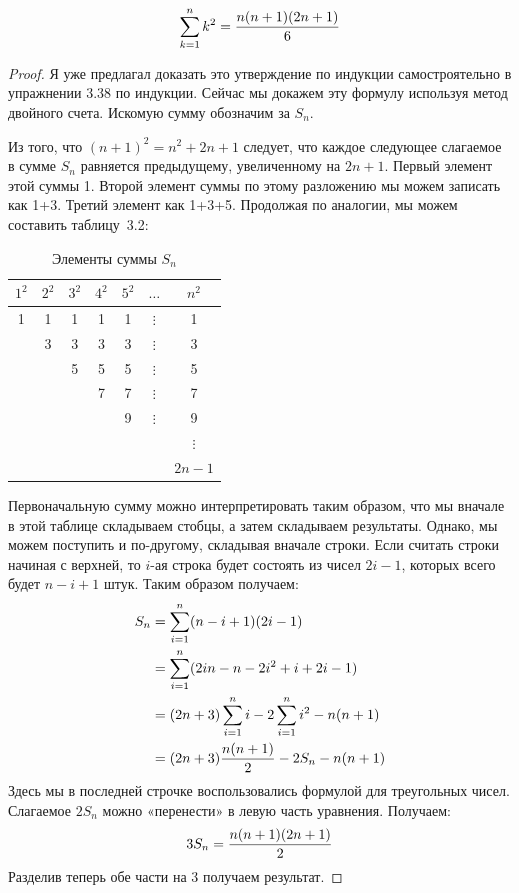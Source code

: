 \begin{thm}
$$\sum_{k=1}^n k^2 = {n(n+1)(2n+1)\over 6}$$
\end{thm}
\begin{proof}
Я уже предлагал доказать это утверждение по индукции самостроятельно в упражнении 3.38 по индукции. Сейчас мы докажем эту формулу используя метод двойного счета. Искомую сумму обозначим за $S_n$.

Из того, что $(n+1)^2 = n^2 + 2n + 1$ следует, что каждое следующее слагаемое в сумме $S_n$ равняется предыдущему, увеличенному на $2n+1$. Первый элемент этой суммы 1. Второй элемент суммы по этому разложению мы можем записать как 1+3. Третий элемент как 1+3+5. Продолжая по аналогии, мы можем составить таблицу~3.2:

\begin{table}[h]
\centering
\begin{tabular}{ccccccc}
$1^2$ & $2^2$ & $3^2$ & $4^2$ & $5^2$ & $\ldots$ & $n^2$ \\
\hline
1 & 1 & 1 & 1 & 1 & $\vdots$ & 1 \\
& 3 & 3 & 3 & 3 & $\vdots$ & 3 \\
& & 5 & 5 & 5 & $\vdots$ & 5 \\
& & & 7 & 7 & $\vdots$ & 7 \\
& & & & 9 & $\vdots$ & 9 \\
& & & & & &  $\vdots$  \\
& & & & & &  $2n-1$  \\
\end{tabular}
\caption{Элементы суммы $S_n$}
\end{table}

Первоначальную сумму можно интерпретировать таким образом, что мы вначале в этой таблице складываем стобцы, а затем складываем результаты. Однако, мы можем поступить и по-другому, складывая вначале строки. Если считать строки начиная с верхней, то $i$-ая строка будет состоять из чисел $2i-1$, которых всего будет $n-i+1$ штук. Таким образом получаем:
\begin{align*}
S_n & = \sum_{i=1}^n (n-i+1)(2i-1)\\
& = \sum_{i=1}^n (2in - n - 2i^2 + i + 2i - 1)  \\
& = (2n+3)\sum_{i=1}^n i - 2\sum_{i=1}^n i^2 - n(n+1) \\
& = (2n+3){n(n+1)\over 2} - 2S_n - n(n+1)
\end{align*}
Здесь мы в последней строчке воспользовались формулой для треугольных чисел. Слагаемое $2S_n$ можно «перенести» в левую часть уравнения. Получаем:
\begin{align*}
3S_n = {n(n+1)(2n+1)\over 2}
\end{align*}
Разделив теперь обе части на 3 получаем результат.
\end{proof}


